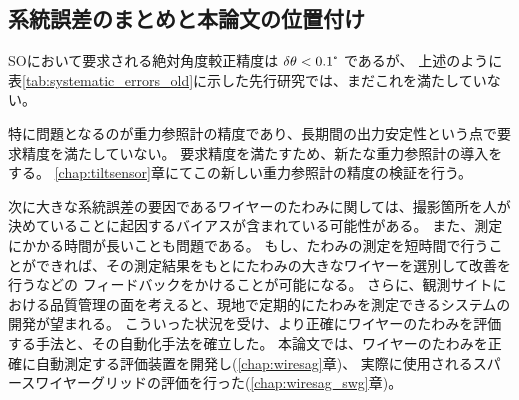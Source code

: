 \documentclass[../../main.tex]{subfiles}
\begin{document}
\subsection{系統誤差のまとめと本論文の位置付け}
SOにおいて要求される絶対角度較正精度は $\delta\theta < 0.1\tcdegree$ であるが、
上述のように表\ref{tab:systematic_errors_old}に示した先行研究では、まだこれを満たしていない。

特に問題となるのが重力参照計の精度であり、長期間の出力安定性という点で要求精度を満たしていない。
要求精度を満たすため、新たな重力参照計の導入をする。
\ref{chap:tiltsensor}章にてこの新しい重力参照計の精度の検証を行う。

次に大きな系統誤差の要因であるワイヤーのたわみに関しては、撮影箇所を人が決めていることに起因するバイアスが含まれている可能性がある。
また、測定にかかる時間が長いことも問題である。
もし、たわみの測定を短時間で行うことができれば、その測定結果をもとにたわみの大きなワイヤーを選別して改善を行うなどの
フィードバックをかけることが可能になる。
さらに、観測サイトにおける品質管理の面を考えると、現地で定期的にたわみを測定できるシステムの開発が望まれる。
こういった状況を受け、より正確にワイヤーのたわみを評価する手法と、その自動化手法を確立した。
本論文では、ワイヤーのたわみを正確に自動測定する評価装置を開発し(\ref{chap:wiresag}章)、
実際に使用されるスパースワイヤーグリッドの評価を行った(\ref{chap:wiresag_swg}章)。
\end{document}
